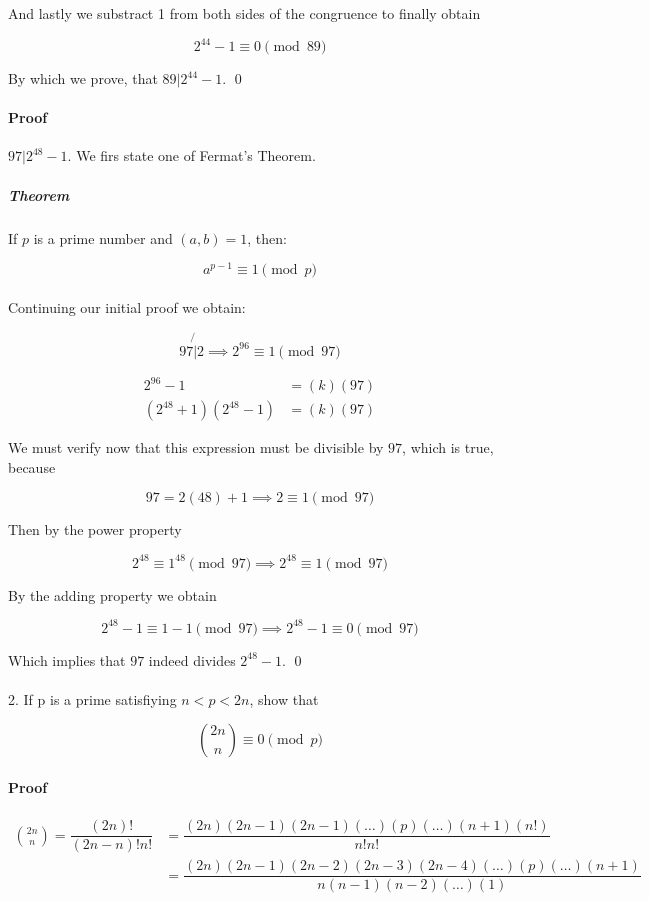 \documentclass{article}
\begin{document}
And lastly we substract 1 from both sides of the congruence to finally obtain

$$2^{44} - 1 \equiv 0 \pmod{89}$$

By which we prove, that $89|2^{44} - 1$. \qed

\paragraph{Proof} $97|2^{48} - 1$. We firs state one of Fermat's Theorem.

\subparagraph{Theorem} If $p$ is a prime number and $(a,b) = 1$, then:

$$a^{p-1} \equiv{ 1 \pmod{p} }$$

\paragraph{} Continuing our initial proof we obtain:

$$97 \not{|} 2 \implies 2^{96} \equiv{1\pmod{97}}$$

\begin{align*}
    2^{96} - 1 &= (k)(97)\\
    (2^{48} + 1)(2^{48} - 1) &= (k)(97)
\end{align*}

We must verify now that this expression must be divisible by $97$, which is true, because

$$97 = 2(48) + 1 \implies 2 \equiv 1 \pmod{97}$$

Then by the power property

$$2^{48} \equiv 1^{48} \pmod{97} \implies 2^{48} \equiv 1 \pmod{97}$$

By the adding property we obtain

$$2^{48} - 1 \equiv 1 -1 \pmod{97} \implies 2^{48} - 1 \equiv 0 \pmod{97}$$

Which implies that $97$ indeed divides $2^{48} - 1$. \qed

\newpage

\paragraph{}2. If p is a prime satisfiying $n<p<2n$, show that

$$\binom{2n}{n} \equiv 0\pmod{p} $$

\paragraph{Proof}
\begin{align*}
  \binom{2n}{n} = \dfrac{(2n)!}{(2n-n)!n!} &= \dfrac{(2n)(2n-1)(2n-1)(\dots) (p)(\dots)(n+1)(n!)}{n!n!}\\
  &= \dfrac{(2n)(2n-1)(2n-2)(2n-3)(2n-4)(\dots)(p)(\dots)(n+1)}{n(n-1)(n-2)(\dots)(1)}
\end{align*}
\end{document}
